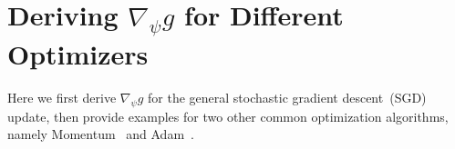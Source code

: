 \section{\label{sec:grad_of_optimizers}Deriving $\nabla_\psi g$ for Different Optimizers}

Here we first derive $\nabla_\psi g$ for the general stochastic gradient descent~(SGD) update, then provide examples for two other common optimization algorithms, namely Momentum~\citep{nesterov} and Adam~\citep{adam}.

